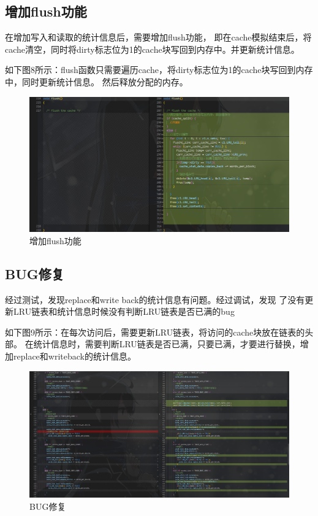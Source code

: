 \documentclass[12pt,hyperref,a4paper,UTF8]{ctexart}
\begin{document}
\subsection*{增加flush功能}

在增加写入和读取的统计信息后，需要增加flush功能，
即在cache模拟结束后，将cache清空，同时将dirty标志位为1的cache块写回到内存中。并更新统计信息。

如下图8所示：flush函数只需要遍历cache，将dirty标志位为1的cache块写回到内存中，同时更新统计信息。
然后释放分配的内存。

\begin{figure}[H]
    \centering
    \includegraphics[width=1\textwidth]{./figures/fig/image8.png}
    \caption{增加flush功能}
\end{figure}

\subsection*{BUG修复}
经过测试，发现replace和write back的统计信息有问题。经过调试，发现
了没有更新LRU链表和统计信息时候没有判断LRU链表是否已满的bug

如下图9所示：在每次访问后，需要更新LRU链表，将访问的cache块放在链表的头部。 在统计信息时，需要判断LRU链表是否已满，只要已满，才要进行替换，增加replace和writeback的统计信息。

\begin{figure}[H]
    \centering
    \includegraphics[width=1\textwidth]{./figures/fig/image9.png}
    \caption{BUG修复}
\end{figure}
\end{document}
